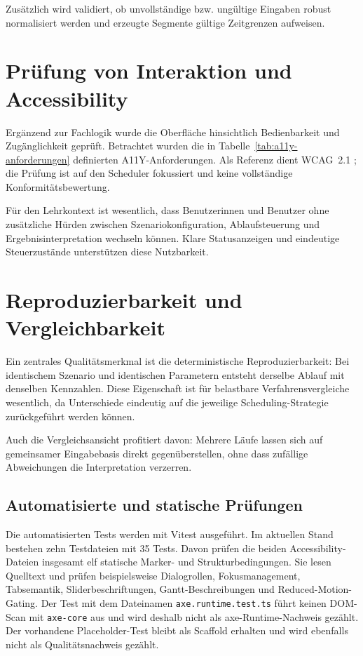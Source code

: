 Zusätzlich wird validiert, ob unvollständige bzw. ungültige Eingaben robust normalisiert werden und erzeugte Segmente gültige Zeitgrenzen aufweisen.

\section{Prüfung von Interaktion und Accessibility}

Ergänzend zur Fachlogik wurde die Oberfläche hinsichtlich Bedienbarkeit und Zugänglichkeit geprüft. Betrachtet wurden die in Tabelle~\ref{tab:a11y-anforderungen} definierten A11Y-Anforderungen. Als Referenz dient WCAG~2.1 \cite{wcag2018}; die Prüfung ist auf den Scheduler fokussiert und keine vollständige Konformitätsbewertung.

Für den Lehrkontext ist wesentlich, dass Benutzerinnen und Benutzer ohne zusätzliche Hürden zwischen Szenariokonfiguration, Ablaufsteuerung und Ergebnisinterpretation wechseln können. Klare Statusanzeigen und eindeutige Steuerzustände unterstützen diese Nutzbarkeit.

\section{Reproduzierbarkeit und Vergleichbarkeit}

Ein zentrales Qualitätsmerkmal ist die deterministische Reproduzierbarkeit: Bei identischem Szenario und identischen Parametern entsteht derselbe Ablauf mit denselben Kennzahlen. Diese Eigenschaft ist für belastbare Verfahrensvergleiche wesentlich, da Unterschiede eindeutig auf die jeweilige Scheduling-Strategie zurückgeführt werden können.

Auch die Vergleichsansicht profitiert davon: Mehrere Läufe lassen sich auf gemeinsamer Eingabebasis direkt gegenüberstellen, ohne dass zufällige Abweichungen die Interpretation verzerren.

\subsection{Automatisierte und statische Prüfungen}

Die automatisierten Tests werden mit Vitest ausgeführt. Im aktuellen Stand bestehen zehn Testdateien mit 35 Tests. Davon prüfen die beiden Accessibility-Dateien insgesamt elf statische Marker- und Strukturbedingungen. Sie lesen Quelltext und prüfen beispielsweise Dialogrollen, Fokusmanagement, Tabsemantik, Sliderbeschriftungen, Gantt-Beschreibungen und Reduced-Motion-Gating. Der Test mit dem Dateinamen \texttt{axe.runtime.test.ts} führt keinen DOM-Scan mit \texttt{axe-core} aus und wird deshalb nicht als axe-Runtime-Nachweis gezählt. Der vorhandene Placeholder-Test bleibt als Scaffold erhalten und wird ebenfalls nicht als Qualitätsnachweis gezählt.


